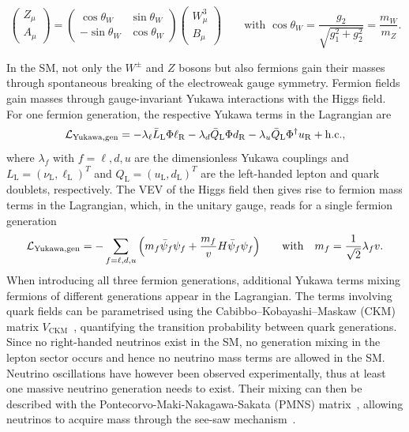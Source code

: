 \begin{equation}
	\begin{pmatrix}
		Z_\mu \\
		A_\mu
	\end{pmatrix} =
	\begin{pmatrix}
		\cos{\theta_W} & \sin{\theta_W} \\
		- \sin{\theta_W} & \cos{\theta_W}
	\end{pmatrix}
	\begin{pmatrix}
		W^3_\mu \\
		B_\mu
	\end{pmatrix} \qquad \textrm{with } \cos{\theta_W} = \frac{g_2}{\sqrt{g_1^2 + g_2^2}} = \frac{m_W}{m_Z}.
\end{equation}

In the SM, not only the $W^\pm$ and $Z$ bosons but also fermions gain their masses through spontaneous breaking of the electroweak gauge symmetry. Fermion fields gain masses through gauge-invariant Yukawa interactions with the Higgs field. For one fermion generation, the respective Yukawa terms in the Lagrangian are
\begin{equation}
	\mathcal{L}_\mathrm{Yukawa,gen} = - \lambda_\ell \bar{L}_\mathrm{L}\Phi\ell_\mathrm{R} - \lambda_d \bar{Q}_\mathrm{L}\Phi d_\mathrm{R} - \lambda_u \bar{Q}_\mathrm{L} \Phi^\dagger u_\mathrm{R} + \mathrm{h.c.},
\end{equation}
where $\lambda_f$ with $f = \ell,d,u$ are the dimensionless Yukawa couplings and $L_\mathrm{L} = (\nu_\mathrm{L},\ell_\mathrm{L})^T$ and $Q_\mathrm{L} = (u_\mathrm{L},d_\mathrm{L})^T$ are the left-handed lepton and quark doublets, respectively. The VEV of the Higgs field then gives rise to fermion mass terms in the Lagrangian, which, in the unitary gauge, reads for a single fermion generation
\begin{equation}
 	\mathcal{L}_\mathrm{Yukawa, gen} = - \sum_{f=\ell,d,u}{\left(m_f\bar{\psi}_f\psi_f + \frac{m_f}{v}H\bar{\psi}_f\psi_f\right)} \qquad \textrm{with} \quad m_f = \frac{1}{\sqrt{2}}\lambda_f v.
\end{equation}
When introducing all three fermion generations, additional Yukawa terms mixing fermions of different generations appear in the Lagrangian. The terms involving quark fields can be parametrised using the Cabibbo–Kobayashi–Maskaw (CKM) matrix $V_\mathrm{CKM}$~\cite{PhysRevLett.10.531,CKM:1973fv}, quantifying the transition probability between quark generations. Since no right-handed neutrinos exist in the SM, no generation mixing in the lepton sector occurs and hence no neutrino mass terms are allowed in the SM. Neutrino oscillations have however been observed experimentally, thus at least one massive neutrino generation needs to exist. Their mixing can then be described with the Pontecorvo-Maki-Nakagawa-Sakata (PMNS) matrix~\cite{PMNS:1962mu}, allowing neutrinos to acquire mass \eg through the see-saw mechanism~\cite{Brdar:2019iem}.
 
